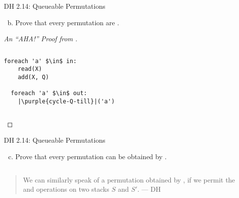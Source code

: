 \begin{frame}[fragile]{}
  \begin{exampleblock}{DH 2.14: Queueable Permutations}
    \begin{enumerate}[(a)]
      \setcounter{enumi}{1}
      \item Prove that every permutation are .
    \end{enumerate}
  \end{exampleblock}

  \begin{proof}[An ``AHA!'' Proof from ]
    \begin{columns}[b]
      \pause
	\begin{lstlisting}[style = Cstyle]
  foreach 'a' $\in$ in:
    read(X)
    add(X, Q)

  foreach 'a' $\in$ out:
    |\purple{cycle-Q-till}|('a')
        \end{lstlisting}
      \pause
    \end{columns}
  \end{proof}
\end{frame}

\begin{frame}{}
  \begin{exampleblock}{DH 2.14: Queueable Permutations}
    \begin{enumerate}[(a)]
      \setcounter{enumi}{2}
      \item Prove that every permutation can be obtained by .
    \end{enumerate}
  \end{exampleblock}

  \pause
  \vspace{0.30cm}
  \begin{columns}[b]
  \end{columns}

  \pause
  \vspace{0.30cm}
  \begin{quote}
    We can similarly speak of a permutation obtained by ,
    if we permit the  and  operations 
    on two stacks $S$ and $S'$. \hfill --- DH
  \end{quote}
\end{frame}

